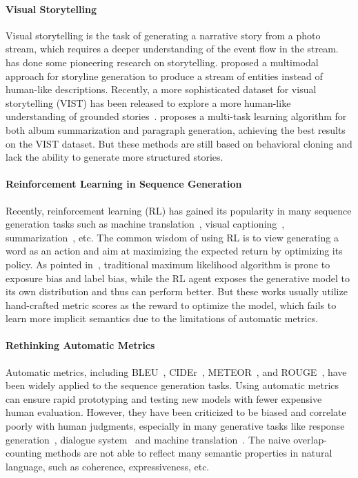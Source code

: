 \documentclass[11pt,a4paper]{article}
\begin{document}
\paragraph{Visual Storytelling}
Visual storytelling is the task of generating a narrative story from a photo stream, which requires a deeper understanding of the event flow in the stream. \citet{park2015expressing} has done some pioneering research on storytelling. \citet{ijcai2017-chen-multimodal} proposed a multimodal approach for storyline generation to produce a stream of entities instead of human-like descriptions. Recently, a more sophisticated dataset for visual storytelling (VIST) has been released to explore a more human-like understanding of grounded stories~\cite{huang2016visual}. \citet{yu-bansal-berg:2017:EMNLP2017} proposes a multi-task learning algorithm for both album summarization and paragraph generation, achieving the best results on the VIST dataset. But these methods are still based on behavioral cloning and lack the ability to generate more structured stories.

\paragraph{Reinforcement Learning in Sequence Generation}
Recently, reinforcement learning (RL) has gained its popularity in many sequence generation tasks such as machine translation~\cite{bahdanau2016actor}, visual captioning~\cite{Ren_etal_CVPR_17,wang2018video}, summarization~\cite{paulus2017deep,chen2018generative}, etc. 
The common wisdom of using RL is to view generating a word as an action and aim at maximizing the expected return by optimizing its policy. As pointed in~\cite{ranzato2015sequence}, traditional maximum likelihood algorithm is prone to exposure bias and label bias, while the RL agent exposes the generative model to its own distribution and thus can perform better. But these works usually utilize hand-crafted metric scores as the reward to optimize the model, which fails to learn more implicit semantics due to the limitations of automatic metrics.

\paragraph{Rethinking Automatic Metrics}
Automatic metrics, including BLEU~\cite{papineni2002bleu}, CIDEr~\cite{vedantam2015cider}, METEOR~\cite{banerjee2005meteor}, and ROUGE~\cite{lin2004rouge}, have been widely applied to the sequence generation tasks. Using automatic metrics can ensure rapid prototyping and testing new models with fewer expensive human evaluation. However, they have been criticized to be biased and correlate poorly with human judgments, 
especially in many generative tasks like response generation~\cite{lowe2017towards,liu2016not}, dialogue system~\cite{bruni2017adversarial} and machine translation~\cite{callison2006re}. 
The naive overlap-counting methods are not able to reflect many semantic properties in natural language, such as coherence, expressiveness, etc. 
\end{document}
